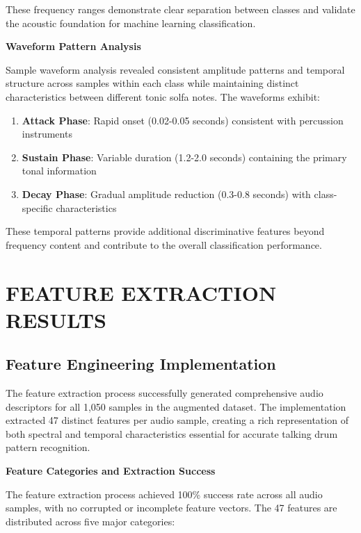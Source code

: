 \documentclass[12pt,a4paper]{article}
\begin{document}
These frequency ranges demonstrate clear separation between classes and validate the acoustic foundation for machine learning classification.

\textbf{Waveform Pattern Analysis}

Sample waveform analysis revealed consistent amplitude patterns and temporal structure across samples within each class while maintaining distinct characteristics between different tonic solfa notes. The waveforms exhibit:

\begin{enumerate}
\item \textbf{Attack Phase}: Rapid onset (0.02-0.05 seconds) consistent with percussion instruments
\item \textbf{Sustain Phase}: Variable duration (1.2-2.0 seconds) containing the primary tonal information
\item \textbf{Decay Phase}: Gradual amplitude reduction (0.3-0.8 seconds) with class-specific characteristics
\end{enumerate}

These temporal patterns provide additional discriminative features beyond frequency content and contribute to the overall classification performance.

\section{FEATURE EXTRACTION RESULTS}

\subsection{Feature Engineering Implementation}

The feature extraction process successfully generated comprehensive audio descriptors for all 1,050 samples in the augmented dataset. The implementation extracted 47 distinct features per audio sample, creating a rich representation of both spectral and temporal characteristics essential for accurate talking drum pattern recognition.

\textbf{Feature Categories and Extraction Success}

The feature extraction process achieved 100\% success rate across all audio samples, with no corrupted or incomplete feature vectors. The 47 features are distributed across five major categories:
\end{document}
